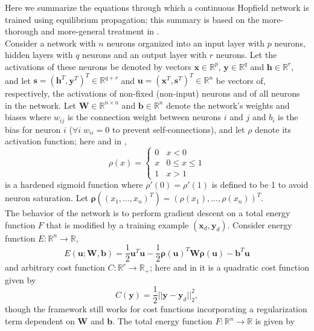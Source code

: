 \documentclass[format=sigconf]{acmart}
\newcommand{\mtx}[1]{\bm{#1}}
\newcommand{\npar}{\\\indent}
\begin{document}
Here we summarize the equations through which a continuous Hopfield network is trained using equilibrium propagation; this summary is based on the more-thorough and more-general treatment in \cite{scellier17}.
\npar
Consider a network with $n$ neurons organized into an input layer with $p$ neurons, hidden layers with $q$ neurons and an output layer with $r$ neurons. Let the activations of these neurons be denoted by vectors $\mtx{x}\in\mathbb{R}^{p}$, $\mtx{y}\in\mathbb{R}^{q}$ and $\mtx{h}\in\mathbb{R}^{r}$, and let $\mtx{s}=(\mtx{h}^{T},\mtx{y}^{T})^{T}\in\mathbb{R}^{q+r}$ and $\mtx{u}=(\mtx{x}^{T}, \mtx{s}^{T})^{T}\in\mathbb{R}^{n}$ be vectors of, respectively, the activations of non-fixed (non-input) neurons and of all neurons in the network. Let $\mtx{W}\in\mathbb{R}^{n\times n}$ and $\mtx{b}\in\mathbb{R}^{n}$ denote the network's weights and biases where $w_{ij}$ is the connection weight between neurons $i$ and $j$ and $b_i$ is the bias for neuron $i$ ($\forall i \;w_{ii}=0$ to prevent self-connections), and let $\rho$ denote its activation function; here and in \cite{scellier17},
\begin{equation}
\label{eqn:hardened_sigmoid}
\rho(x)=\begin{cases}0&x<0\\x&0\leq x\leq 1\\1&x>1\end{cases} 
\end{equation} \sloppy is a hardened sigmoid function
where $\rho'(0)=\rho'(1)$ is defined to be 1 to avoid neuron saturation. Let $\mtx{\rho}((x_1,\hdots, x_n)^T)=(\rho(x_1),\hdots,\rho(x_n))^T$.
\npar
The behavior of the network is to perform gradient descent on a total energy function $F$ that is modified by a training example $(\mtx{x}_d,\mtx{y}_d)$. Consider energy function $E:\mathbb{R}^n\to\mathbb{R}$,
\begin{equation}
E(\mtx{u}; \mtx{W}, \mtx{b})=\frac{1}{2}\mtx{u}^T\mtx{u}-\frac{1}{2}\mtx{\rho}(\mtx{u})^T \mtx{W} \mtx{\rho}(\mtx{u})-\mtx{b}^T\mtx{u}
\end{equation}
and arbitrary cost function $C:\mathbb{R}^r\to\mathbb{R}_{+}$; here and in \cite{scellier17} it is a quadratic cost function given by
\begin{equation}
\label{eqn:cost}
C(\mtx{y})=\frac{1}{2}||\mtx{y}-\mtx{y}_d||_2^2,
\end{equation}
though the framework still works for cost functions incorporating a regularization term dependent on $\mtx{W}$ and $\mtx{b}$. The total energy function $F:\mathbb{R}^n\to\mathbb{R}$ is given by
\end{document}
